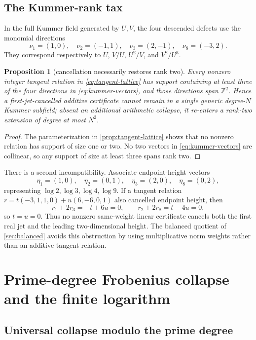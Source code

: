 \documentclass[11pt]{article}
\newtheorem{proposition}[theorem]{Proposition}
\theoremstyle{definition}
\theoremstyle{remark}
\newcommand{\ZZ}{\mathbb Z}
\begin{document}
\subsection{The Kummer-rank tax}
In the full Kummer field generated by \(U,V\), the four descended defects use the monomial directions
\begin{equation}\label{eq:kummer-vectors}
\nu_1=(1,0),\quad
\nu_2=(-1,1),\quad
\nu_3=(2,-1),\quad
\nu_8=(-3,2).
\end{equation}
They correspond respectively to \(U\), \(V/U\), \(U^2/V\), and \(V^2/U^3\).

\begin{proposition}[cancellation necessarily restores rank two]\label{prop:rank-tax}
Every nonzero integer tangent relation in \eqref{eq:tangent-lattice} has support containing at least three of the four directions in \eqref{eq:kummer-vectors}, and those directions span \(\ZZ^2\).  Hence a first-jet-cancelled additive certificate cannot remain in a single generic degree-\(N\) Kummer subfield; absent an additional arithmetic collapse, it re-enters a rank-two extension of degree at most \(N^2\).
\end{proposition}

\begin{proof}
The parameterization in \cref{prop:tangent-lattice} shows that no nonzero relation has support of size one or two.  No two vectors in \eqref{eq:kummer-vectors} are collinear, so any support of size at least three spans rank two.
\end{proof}

There is a second incompatibility.  Associate endpoint-height vectors
\[
\eta_1=(1,0),\quad\eta_2=(0,1),\quad
\eta_3=(2,0),\quad\eta_8=(0,2),
\]
representing \(\log2,\log3,\log4,\log9\).  If a tangent relation
\(r=t(-3,1,1,0)+u(6,-6,0,1)\) also cancelled endpoint height, then
\[
r_1+2r_3=-t+6u=0,
\qquad r_2+2r_8=t-4u=0,
\]
so \(t=u=0\).  Thus no nonzero same-weight linear certificate cancels both the first real jet and the leading two-dimensional height.  The balanced quotient of \cref{sec:balanced} avoids this obstruction by using multiplicative norm weights rather than an additive tangent relation.

\section{Prime-degree Frobenius collapse and the finite logarithm}\label{sec:frobenius}

\subsection{Universal collapse modulo the prime degree}
\end{document}
